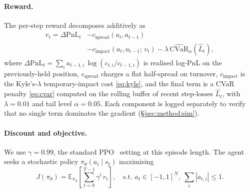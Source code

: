 \documentclass[conference]{IEEEtran}
\begin{document}
\paragraph{Reward.} The per-step reward decomposes additively as
\begin{equation}
  \begin{split}
    r_t = \Delta\mathrm{PnL}_t &- c_{\text{spread}}(a_t, a_{t-1}) \\
          &- c_{\text{impact}}(a_t, a_{t-1};\, v_t)
           - \lambda\,\widehat{\mathrm{CVaR}}_\alpha(\hat L_t),
  \end{split}
  \label{eq:reward-mdp}
\end{equation}
where $\Delta\mathrm{PnL}_t = \sum_i a_{t-1,i}\,\log(c_{t,i}/c_{t-1,i})$
is realised log-PnL on the previously-held position, $c_{\text{spread}}$
charges a flat half-spread on turnover, $c_{\text{impact}}$ is the
Kyle's-$\lambda$ temporary-impact cost \eqref{eq:kyle}, and the final
term is a CVaR penalty \eqref{eq:cvar} computed on the rolling buffer of
recent step-losses $\hat L_t$, with $\lambda = 0.01$ and tail level
$\alpha = 0.05$. Each component is logged separately to verify that no
single term dominates the gradient (\S\ref{sec:method:sim}).

\paragraph{Discount and objective.} We use $\gamma = 0.99$, the standard
PPO~\cite{schulman2017ppo} setting at this episode length. The agent
seeks a stochastic policy $\pi_\theta(a_t \mid s_t)$ maximising
\begin{equation}
  J(\pi_\theta) = \mathbb{E}_{\pi_\theta}\!\left[\sum_{t=0}^{T-1} \gamma^t\, r_t\right],
  \quad \text{s.t.\ } a_t \in [-1,1]^{N},\ \sum_i |a_{t,i}| \le 1.
  \label{eq:objective}
\end{equation}
\end{document}
